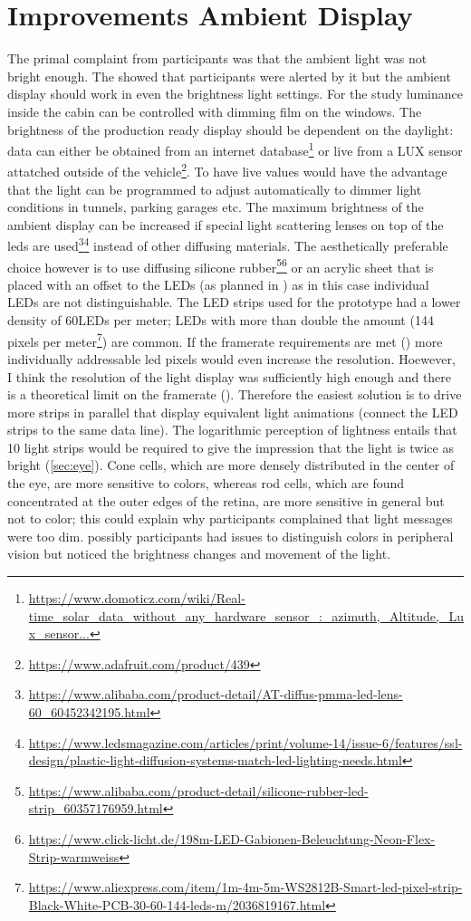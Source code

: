 \section{Improvements Ambient Display}
\label{ImrpoveDisplay}
The primal complaint from participants was that the ambient light was not bright enough. The  showed that participants were alerted by it but the ambient display should work in even the brightness light settings. For the study luminance inside the cabin can be controlled with dimming film on the windows. The brightness of the production ready display should be dependent on the daylight: data can either be obtained from an internet database\footnote{\url{https://www.domoticz.com/wiki/Real-time_solar_data_without_any_hardware_sensor_:_azimuth,_Altitude,_Lux_sensor...}} or live from a LUX sensor attatched outside of the vehicle\footnote{\url{https://www.adafruit.com/product/439}}. To have live values would have the advantage that the light can be programmed to adjust automatically to dimmer light conditions in tunnels, parking garages etc. The maximum brightness of the ambient display can be increased if special light scattering lenses on top of the leds are used\footnote{\url{https://www.alibaba.com/product-detail/AT-diffus-pmma-led-lens-60_60452342195.html}}\fnsep\footnote{\url{https://www.ledsmagazine.com/articles/print/volume-14/issue-6/features/ssl-design/plastic-light-diffusion-systems-match-led-lighting-needs.html}} instead of other diffusing materials. The aesthetically preferable choice however is to use diffusing silicone rubber\footnote{\url{https://www.alibaba.com/product-detail/silicone-rubber-led-strip_60357176959.html}}\fnsep\footnote{\url{https://www.click-licht.de/198m-LED-Gabionen-Beleuchtung-Neon-Flex-Strip-warmweiss}} or an acrylic sheet that is placed with an offset to the LEDs (as planned in ) as in this case individual LEDs are not distinguishable. The LED strips used for the prototype had a lower density of 60LEDs per meter; LEDs with more than double the amount (144 pixels per meter\footnote{\url{https://www.aliexpress.com/item/1m-4m-5m-WS2812B-Smart-led-pixel-strip-Black-White-PCB-30-60-144-leds-m/2036819167.html}}) are common. If the framerate requirements are met () more individually addressable led pixels would even increase the resolution. Hoewever, I think the resolution of the light display was sufficiently high enough and there is a theoretical limit on the framerate (). Therefore the easiest solution is to drive more strips in parallel that display equivalent light animations (connect the LED strips to the same data line). The logarithmic perception of lightness entails that 10 light strips would be required to give the impression that the light is twice as bright (\ref{sec:eye}). Cone cells, which are more densely distributed in the center of the eye, are more sensitive to colors, whereas rod cells, which are found concentrated at the outer edges of the retina, are more sensitive in general but not to color; this could explain why participants complained that light messages were too dim. possibly participants had issues to distinguish colors in peripheral vision but noticed the brightness changes and movement of the light. 
